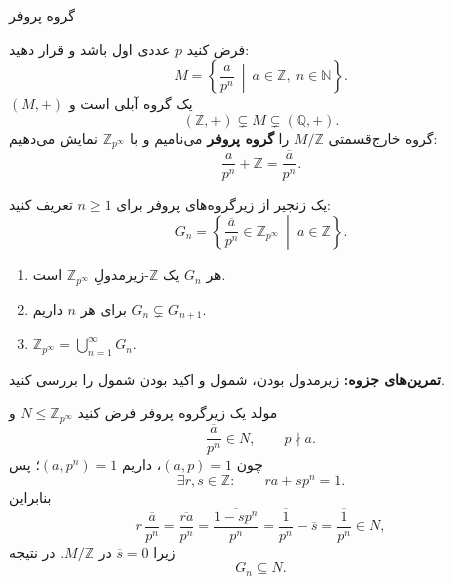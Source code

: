 \begin{frame}[t]{گروه پروفر}
    \label{lec10:prufer-definition}
    \begin{definition}
        فرض کنید $p$ عددی اول باشد و قرار دهید:
        \[
            M=\left\{\frac{a}{p^n}\ \middle|\ %
                a\in\mathbb Z,\ n\in\mathbb N\right\}.
        \]
        $(M,+)$ یک گروه آبلی است و
        \[
            (\mathbb Z,+)\subsetneq M\subsetneq(\mathbb Q,+).
        \]
        گروه خارج‌قسمتی $M/\mathbb Z$ را \textbf{گروه پروفر} می‌نامیم و
        با $\mathbb Z_{p^\infty}$ نمایش می‌دهیم:
        \[
            \frac{a}{p^n}+\mathbb Z
            =\overline{\frac{a}{p^n}}.
        \]
    \end{definition}
\end{frame}

\begin{frame}[t]{یک زنجیر از زیرگروه‌های پروفر}
    \label{lec10:prufer-chain}
    برای $n\geq1$ تعریف کنید:
    \[
        G_n=\left\{\overline{\frac{a}{p^n}}
            \in\mathbb Z_{p^\infty}\ \middle|\ a\in\mathbb Z\right\}.
    \]
    \begin{enumerate}
        \item هر $G_n$ یک $\mathbb Z$-زیرمدولِ $\mathbb Z_{p^\infty}$ است.
        \item برای هر $n$ داریم $G_n\subsetneq G_{n+1}$.
        \item $\displaystyle\mathbb Z_{p^\infty}=\bigcup_{n=1}^{\infty}G_n$.
    \end{enumerate}
    \textbf{تمرین‌های جزوه:} زیرمدول بودن، شمول و اکید بودن شمول
    را بررسی کنید.
\end{frame}

\begin{frame}[t]{مولد یک زیرگروه پروفر}
    \label{lec10:prufer-bezout}
    فرض کنید $N\leq\mathbb Z_{p^\infty}$ و
    \[
        \overline{\frac{a}{p^n}}\in N,\qquad p\nmid a.
    \]
    چون $(a,p)=1$، داریم $(a,p^n)=1$؛ پس
    \[
        \exists r,s\in\mathbb Z:\qquad ra+sp^n=1.
    \]
    بنابراین
    \[
        r\,\overline{\frac{a}{p^n}}
        =\overline{\frac{ra}{p^n}}
        =\overline{\frac{1-sp^n}{p^n}}
        =\overline{\frac1{p^n}}-\overline{s}
        =\overline{\frac1{p^n}}\in N,
    \]
    زیرا $\overline{s}=0$ در $M/\mathbb Z$. در نتیجه
    \[
        G_n\subseteq N.
    \]
\end{frame}

